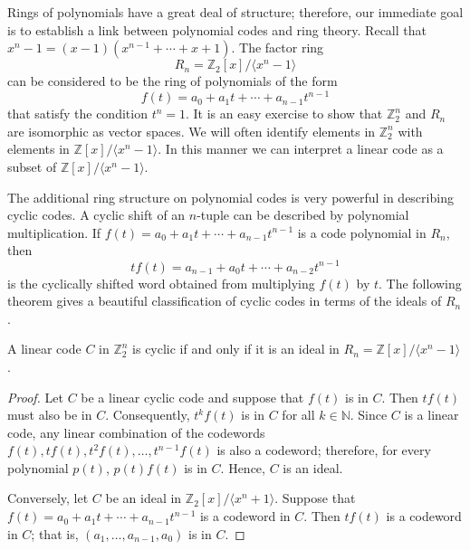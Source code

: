 Rings of polynomials have a great deal of structure; therefore, our immediate goal is to establish a link between polynomial codes and ring theory. Recall that $x^n - 1 = (x - 1)( x^{n-1} + \cdots + x + 1)$.  The factor ring 
\[
R_n = {\mathbb Z}_2[x]/ \langle x^n - 1 \rangle
\] 
can be considered to be the ring of polynomials of the form 
\[
f(t) = a_0 + a_1 t + \cdots + a_{n-1} t^{n-1}
\]
that satisfy the condition $t^n = 1$.  It is an easy exercise to show that ${\mathbb Z}_2^n$ and $R_n$ are isomorphic as vector spaces.  We will often identify elements in ${\mathbb Z}_2^n$ with elements in
${\mathbb Z}[x] / \langle x^n - 1 \rangle$.  In this manner we can interpret a linear code as a subset of ${\mathbb Z}[x] / \langle x^n - 1 \rangle$.  

The additional ring structure on polynomial codes is very powerful in describing cyclic codes. A cyclic shift of an $n$-tuple can be described by polynomial multiplication.  If $f(t) = a_0 + a_1 t + \cdots + a_{n-1} t^{n-1}$ is a code polynomial in $R_n$, then
\[
tf(t) = a_{n-1} + a_0 t + \cdots + a_{n-2} t^{n-1}
\]
is the cyclically shifted word obtained from multiplying $f(t)$ by $t$.  The following theorem gives a beautiful classification of cyclic codes in terms of the ideals of $R_n$.

\begin{theorem} \label{finite:cyclic_code_theorem}
A linear code $C$ in ${\mathbb Z}_2^n$ is cyclic if and only if it is an ideal in $R_n = {\mathbb Z}[x] / \langle x^n - 1 \rangle$. 
\end{theorem}
 
\begin{proof}
Let $C$ be a linear cyclic code and suppose that $f(t)$ is in $C$.  Then $t f(t)$ must also be in $C$. Consequently, $t^k f(t)$ is in $C$ for all $k \in {\mathbb N}$.  Since $C$ is a linear code, any linear combination of the codewords $f(t), tf(t), t^2f(t), \ldots, t^{n-1}f(t)$ is also a codeword; therefore, for every polynomial $p(t)$, $p(t)f(t)$ is in $C$.  Hence, $C$ is an ideal. 

Conversely, let $C$ be an ideal in ${\mathbb Z}_2[x]/\langle x^n + 1\rangle$. Suppose that $f(t) = a_0 + a_1 t + \cdots + a_{n - 1} t^{n - 1}$ is a codeword in $C$.  Then $t f(t)$ is a codeword in $C$; that is, $(a_1, \ldots, a_{n-1}, a_0)$ is in $C$.
\end{proof} 

\medskip

